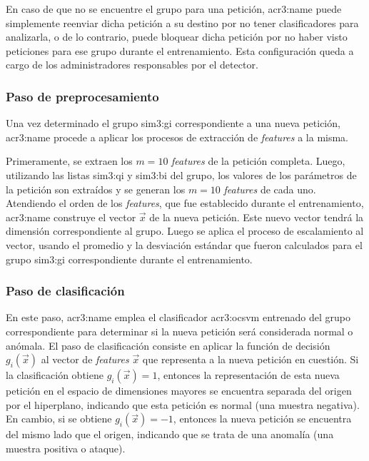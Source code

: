 En caso de que no se encuentre el grupo para una petición, \gls{acr3:name}
puede simplemente reenviar dicha petición a su destino por no tener
clasificadores para analizarla, o de lo contrario, puede bloquear dicha
petición por no haber visto peticiones para ese grupo durante el
entrenamiento. Esta configuración queda a cargo de los administradores
responsables por el detector.


\subsubsection{Paso de preprocesamiento}

Una vez determinado el grupo \gls{sim3:gi} correspondiente a una nueva
petición, \gls{acr3:name} procede a aplicar los procesos de extracción
de \textit{features} a la misma.

Primeramente, se extraen los $m = 10$ \textit{features} de la petición
completa. Luego, utilizando las listas \gls{sim3:qi} y \gls{sim3:bi} del
grupo, los valores de los parámetros de la petición son extraídos y se
generan los $m = 10$ \textit{features} de cada uno.
Atendiendo el orden de los \textit{features}, que fue establecido durante
el entrenamiento, \gls{acr3:name} construye el vector $\vec{x}$ de la
nueva petición. Este nuevo vector tendrá la dimensión correspondiente al
grupo.
Luego se aplica el proceso de escalamiento al vector, usando el promedio
y la desviación estándar que fueron calculados para el grupo \gls{sim3:gi}
correspondiente durante el entrenamiento.


\subsubsection{Paso de clasificación}

En este paso, \gls{acr3:name} emplea el clasificador \gls{acr3:ocsvm}
entrenado del grupo correspondiente para determinar si la nueva petición
será considerada normal o anómala.
El paso de clasificación consiste en aplicar la función de decisión
$g_{i}(\vec{x})$ al vector de \textit{features} $\vec{x}$ que representa
a la nueva petición en cuestión.
Si la clasificación obtiene $g_{i}(\vec{x}) = 1$, entonces la representación
de esta nueva petición en el espacio de dimensiones mayores se encuentra
separada del origen por el hiperplano, indicando que esta petición es
normal (una muestra negativa).
En cambio, si se obtiene $g_{i}(\vec{x}) = -1$, entonces la nueva petición
se encuentra del mismo lado que el origen, indicando que se trata de una
anomalía (una muestra positiva o ataque).


